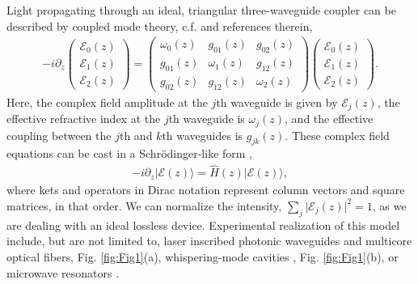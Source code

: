 \documentclass[9pt,twocolumn,twoside]{osajnl}
\begin{document}
Light propagating through an ideal, triangular three-waveguide coupler can be described by coupled mode theory, c.f. \cite{RodriguezLara2015p068014} and references therein,
\begin{eqnarray} \label{eq:CMT}
-i \partial_{z} \left( \begin{array}{c} \mathcal{E}_{0}(z) \\ \mathcal{E}_{1}(z) \\  \mathcal{E}_{2}(z) \end{array} \right) =  \left( \begin{array}{ccc} 
\omega_{0}(z)  & g_{01}(z) & g_{02}(z) \\
g_{01}(z) & \omega_{1}(z) & g_{12}(z) \\
g_{02}(z) & g_{12}(z) & \omega_{2}(z)
\end{array} \right) \left( \begin{array}{c} \mathcal{E}_{0}(z) \\ \mathcal{E}_{1}(z) \\  \mathcal{E}_{2}(z) \end{array} \right).
\end{eqnarray}
Here, the complex field amplitude at the $j$th waveguide is given by $\mathcal{E}_{j}(z)$, the effective refractive index at the $j$th waveguide is $\omega_{j}(z)$, and the effective coupling between the $j$th and $k$th waveguides is $g_{jk}(z)$.
These complex field equations can be cast in a Schr\"odinger-like form \cite{RodriguezLara2015p068014},
\begin{eqnarray}
- i \partial_{z} \vert \mathcal{E}(z) \rangle = \hat{H}(z) \vert \mathcal{E}(z) \rangle,\label{eq:SchLike}
\end{eqnarray}
where kets and operators in Dirac notation represent column vectors and square matrices, in that order.
We can normalize the intensity, $\sum_{j} \vert \mathcal{E}_{j}(z) \vert^2 =1$, as we are dealing with an ideal lossless device.
Experimental realization of this model include, but are not limited to, laser inscribed photonic waveguides \cite{Szameit2010p163001} and  multicore optical fibers, Fig. \ref{fig:Fig1}(a), whispering-mode cavities \cite{Peng2014p394}, Fig. \ref{fig:Fig1}(b), or microwave resonators \cite{FrancoVillafane2013p170405}.
\end{document}
